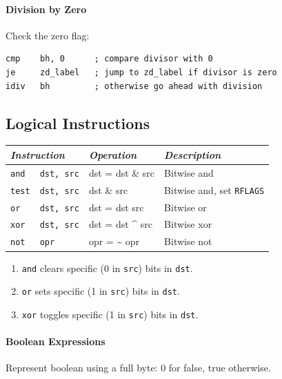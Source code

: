 \documentclass[twocolumn,english]{article}
\providecommand{\tabularnewline}{\\}
\begin{document}
\paragraph{Division by Zero}

Check the zero flag:

\noindent 
\begin{lstlisting}[basicstyle={\footnotesize\ttfamily},frame=single]
cmp    bh, 0      ; compare divisor with 0
je     zd_label   ; jump to zd_label if divisor is zero
idiv   bh         ; otherwise go ahead with division
\end{lstlisting}



\subsection{Logical Instructions}

\begin{table}[H]
\noindent \centering{}\texttt{\footnotesize{}}%
\begin{tabular}{llll}
\toprule 
\multicolumn{2}{l}{\emph{Instruction}} & \emph{Operation} & \emph{Description}\tabularnewline
\midrule
\texttt{and} & \texttt{dst, src} & dst = dst \& src & Bitwise and\tabularnewline
\texttt{test} & \texttt{dst, src} & dst \& src & Bitwise and, set \texttt{RFLAGS}\tabularnewline
\texttt{or} & \texttt{dst, src} & dst = dst \textbar{} src & Bitwise or\tabularnewline
\texttt{xor} & \texttt{dst, src} & dst = dst \textasciicircum{} src & Bitwise xor\tabularnewline
\texttt{not} & \texttt{opr} & opr = \textasciitilde{} opr & Bitwise not\tabularnewline
\bottomrule
\end{tabular}
\end{table}

\begin{enumerate}
\item \texttt{and} clears specific (0 in \texttt{src}) bits in \texttt{dst}.
\item \texttt{or} sets specific (1 in \texttt{src}) bits in \texttt{dst}.
\item \texttt{xor} toggles specific (1 in \texttt{src}) bits in \texttt{dst}.
\end{enumerate}

\paragraph{Boolean Expressions}

Represent boolean using a full byte: 0 for false, true otherwise.
\end{document}
